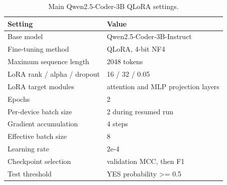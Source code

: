 \begin{table}[H]
\centering
\begin{tabular}{ll}
\toprule
Setting & Value \\
\midrule
Base model & Qwen2.5-Coder-3B-Instruct \\
Fine-tuning method & QLoRA, 4-bit NF4 \\
Maximum sequence length & 2048 tokens \\
LoRA rank / alpha / dropout & 16 / 32 / 0.05 \\
LoRA target modules & attention and MLP projection layers \\
Epochs & 2 \\
Per-device batch size & 2 during resumed run \\
Gradient accumulation & 4 steps \\
Effective batch size & 8 \\
Learning rate & 2e-4 \\
Checkpoint selection & validation MCC, then F1 \\
Test threshold & YES probability >= 0.5 \\
\bottomrule
\end{tabular}
\caption{Main Qwen2.5-Coder-3B QLoRA settings.}
\label{tab:hyperparameters}
\end{table}
